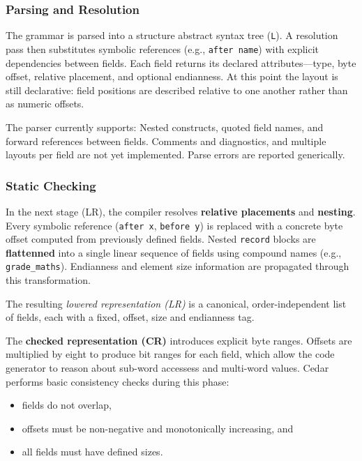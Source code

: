 \subsubsection{Parsing and Resolution}
The grammar is parsed into a structure abstract syntax tree (\texttt{L}).
A resolution pass then substitutes symbolic references (e.g., \texttt{after name})
with explicit dependencies between fields.
Each field returns its declared attributes—type, byte offset, relative placement,
and optional endianness.
At this point the layout is still declarative: field positions are
described relative to one another rather than as numeric offsets.

The parser currently supports: Nested constructs, quoted field names, and forward
references between fields. Comments and diagnostics, and multiple layouts per
field are not yet implemented. Parse errors are reported generically.

\subsubsection{Static Checking}
In the next stage (LR), the compiler resolves \textbf{relative placements} and
\textbf{nesting}. Every symbolic reference (\texttt{after x}, \texttt{before y})
is replaced with a concrete byte offset computed from previously defined fields.
Nested \texttt{record} blocks are \textbf{flattenned} into a single
linear sequence of fields using compound names (e.g., \texttt{grade\_maths}).
Endianness and element size information are propagated through this transformation.

The resulting \textit{lowered representation (LR)} is a canonical, order-independent
list of fields, each with a fixed, offset, size and endianness tag.

The \textbf{checked representation (CR)}  introduces explicit byte ranges.
Offsets are multiplied by eight to produce bit ranges for each field, which
allow the code generator to reason about sub-word accessess and multi-word
values.
Cedar performs basic consistency checks during this phase:

\begin{itemize}
    \item fields do not overlap,
    \item offsets must be non-negative and monotonically increasing, and
    \item all fields must have defined sizes.
\end{itemize}

